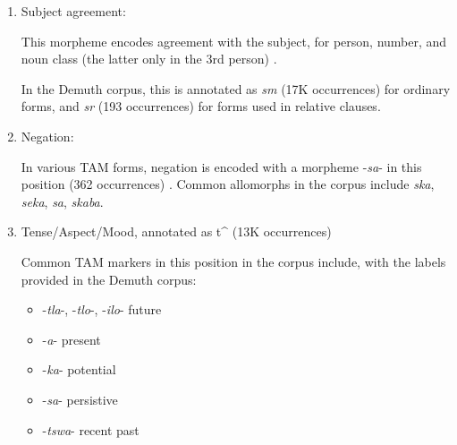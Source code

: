 \documentclass[11pt,letterpaper]{article}
\begin{document}
\begin{enumerate}
    \item Subject agreement: 
    
    This morpheme encodes agreement with the subject, for person, number, and noun class (the latter only in the 3rd person) \cite[]{doke1967textbook} \cite[p. 162]{guma1971outline}.
    
    In the Demuth corpus, this is annotated as \textit{sm} (17K occurrences) for ordinary forms, and \textit{sr} (193 occurrences) for forms used in relative clauses.

   
    
    \item Negation:
    
    In various TAM forms, negation is encoded with a morpheme -\textit{sa}- in this position (362 occurrences) \cite[p. 172]{guma1971outline} \cite[]{doke1967textbook}.
    Common allomorphs in the corpus include \textit{ska}, \textit{seka}, \textit{sa}, \textit{skaba}.
    
    
    
    \item Tense/Aspect/Mood, annotated as t\^{} (13K occurrences) \cite[p. 165]{guma1971outline}
    
    Common TAM markers in this position in the corpus include, with the labels provided in the Demuth corpus:
    
    \begin{itemize}
    \item -\textit{tla}-, -\textit{tlo}-, -\textit{ilo}- future \cite[--412]{doke1967textbook}
    \item -\textit{a}- present \cite[]{doke1967textbook}
    \item -\textit{ka}- potential \cite[--428]{doke1967textbook}
    \item -\textit{sa}- persistive \cite[--418]{doke1967textbook}
    \item -\textit{tswa}- recent past \cite[--406]{doke1967textbook} 
    
    
    \end{itemize}
    

\end{enumerate}
\end{document}
